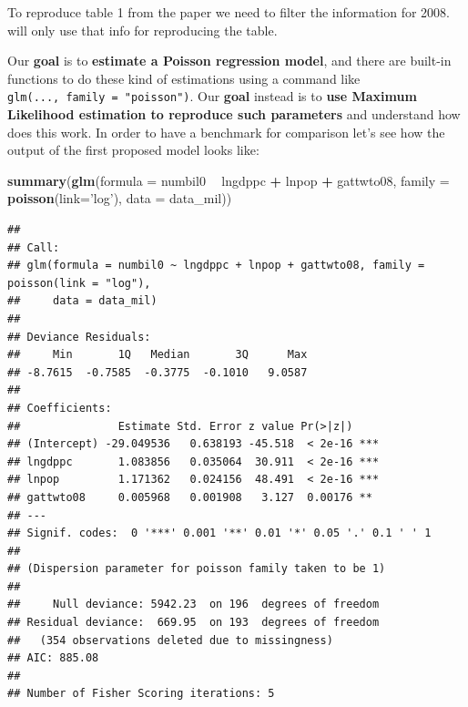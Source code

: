 \documentclass[]{book}
\newenvironment{Shaded}{\begin{snugshade}}{\end{snugshade}}
\newcommand{\KeywordTok}[1]{\textcolor[rgb]{0.13,0.29,0.53}{\textbf{#1}}}
\newcommand{\DataTypeTok}[1]{\textcolor[rgb]{0.13,0.29,0.53}{#1}}
\newcommand{\DecValTok}[1]{\textcolor[rgb]{0.00,0.00,0.81}{#1}}
\newcommand{\StringTok}[1]{\textcolor[rgb]{0.31,0.60,0.02}{#1}}
\newcommand{\OperatorTok}[1]{\textcolor[rgb]{0.81,0.36,0.00}{\textbf{#1}}}
\newcommand{\NormalTok}[1]{#1}
\begin{document}
To reproduce table 1 from the paper we need to filter the information
for 2008. will only use that info for reproducing the table.

\begin{Shaded}
\end{Shaded}

Our \textbf{goal} is to \textbf{estimate a Poisson regression model},
and there are built-in functions to do these kind of estimations using a
command like \texttt{glm(...,\ family\ =\ "poisson")}. Our \textbf{goal}
instead is to \textbf{use Maximum Likelihood estimation to reproduce
such parameters} and understand how does this work. In order to have a
benchmark for comparison let's see how the output of the first proposed
model looks like:

\begin{Shaded}
\begin{Highlighting}[]
\KeywordTok{summary}\NormalTok{(}\KeywordTok{glm}\NormalTok{(}\DataTypeTok{formula =}\NormalTok{ numbil0 }\OperatorTok{~}\StringTok{ }\NormalTok{lngdppc }\OperatorTok{+}\StringTok{ }\NormalTok{lnpop }\OperatorTok{+}\StringTok{ }\NormalTok{gattwto08, }\DataTypeTok{family =} \KeywordTok{poisson}\NormalTok{(}\DataTypeTok{link=}\StringTok{'log'}\NormalTok{), }\DataTypeTok{data =}\NormalTok{ data_mil))}
\end{Highlighting}
\end{Shaded}

\begin{verbatim}
## 
## Call:
## glm(formula = numbil0 ~ lngdppc + lnpop + gattwto08, family = poisson(link = "log"), 
##     data = data_mil)
## 
## Deviance Residuals: 
##     Min       1Q   Median       3Q      Max  
## -8.7615  -0.7585  -0.3775  -0.1010   9.0587  
## 
## Coefficients:
##               Estimate Std. Error z value Pr(>|z|)    
## (Intercept) -29.049536   0.638193 -45.518  < 2e-16 ***
## lngdppc       1.083856   0.035064  30.911  < 2e-16 ***
## lnpop         1.171362   0.024156  48.491  < 2e-16 ***
## gattwto08     0.005968   0.001908   3.127  0.00176 ** 
## ---
## Signif. codes:  0 '***' 0.001 '**' 0.01 '*' 0.05 '.' 0.1 ' ' 1
## 
## (Dispersion parameter for poisson family taken to be 1)
## 
##     Null deviance: 5942.23  on 196  degrees of freedom
## Residual deviance:  669.95  on 193  degrees of freedom
##   (354 observations deleted due to missingness)
## AIC: 885.08
## 
## Number of Fisher Scoring iterations: 5
\end{verbatim}
\end{document}
